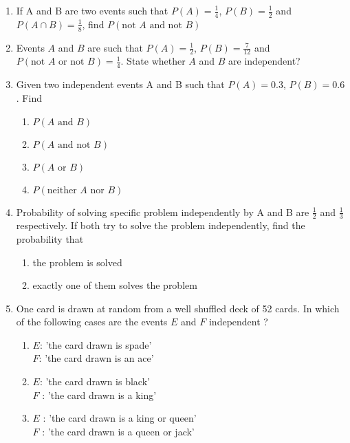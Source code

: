 \begin{enumerate}[label=\thechapter.\arabic*,ref=\thechapter.\theenumi]
\begin{enumerate}
\end{enumerate}
\item If A and B are two events such that $P(A)=\frac{1}{4}$, $P(B)=\frac{1}{2}$ and $P(A \cap B)=\frac{1}{8}$, find $P(\text{not }A \text{ and not }B)$
		\label{ncert/12/13/2/8}
\item Events $A$ and $B$ are such that $P(A)=\frac{1}{2}$, $P(B)=\frac{7}{12}$ and $P(\text{not }A \text{ or not }B)=\frac{1}{4}$. State whether $A$ and $B$ are independent?
		\label{ncert/12/13/2/9}
\item Given two independent events A and B such that $P(A) = 0.3$, $P(B) = 0.6$. Find
		\label{ncert/12/13/2/10}
\begin{enumerate}
\item $P(A\text{ and } B)$
\item $P(A \text{ and not } B)$
\item $P(A \text{ or } B)$
\item $P(\text{neither } A \text{ nor } B)$
\end{enumerate}
%
\item Probability of solving specific problem independently by A and B are $\frac{1}{2}$ and $\frac{1}{3}$ respectively. If both try to solve the problem independently, find the probability that
		\label{ncert/12/13/2/13}
\begin{enumerate}
\item the problem is solved
\item exactly one of them solves the problem
\end{enumerate}
\solution

\item One card is drawn at random from a well shuffled deck of 52 cards. In which of the following cases are the events $E$ and $F$ independent ?
		\label{ncert/12/13/2/14}
\begin{enumerate}
\item $E$: 'the card drawn is spade'\\
$F$: 'the card drawn is an ace'
\item $E$: 'the card drawn is black’\\
$F$ : 'the card drawn is a king’
\item $E$ : 'the card drawn is a king or queen’\\
$F$ : 'the card drawn is a queen or jack’
\end{enumerate}
\solution

\end{enumerate}

